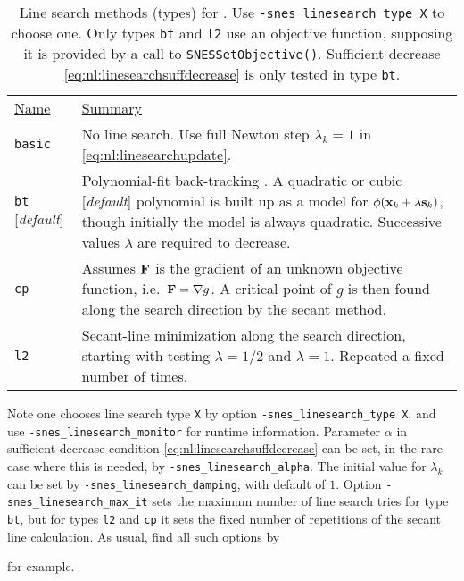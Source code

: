 \begin{table}
\begin{tabular}{ll}
\underline{Name} & \underline{Summary} \vspace{0.05in} \\ \vspace{0.1in}
\texttt{basic} & No line search.  Use full Newton step $\lambda_k=1$ in \eqref{eq:nl:linesearchupdate}. \\ \vspace{0.1in}
\texttt{bt} [\emph{default}] & \begin{minipage}[t]{0.8\textwidth}
Polynomial-fit back-tracking \citep[section 6.3.2]{DennisSchnabel1983}.  A quadratic or cubic [\emph{default}] polynomial is built up as a model for \mbox{$\phi(\mathbf{x}_k+\lambda \mathbf{s}_k)$}, though initially the model is always quadratic.  Successive values $\lambda$ are required to decrease.
\end{minipage} \\ \vspace{0.1in}
\texttt{cp} & \begin{minipage}[t]{0.83\textwidth}
Assumes $\mathbf{F}$ is the gradient of an unknown objective function, i.e.~\mbox{$\mathbf{F}=\nabla g$}.  A critical point of $g$ is then found along the search direction by the secant method.
\end{minipage} \\ \vspace{0.1in}
\texttt{l2} & \begin{minipage}[t]{0.83\textwidth}
Secant-line minimization along the search direction, starting with testing \mbox{$\lambda=1/2$} and \mbox{$\lambda=1$}. Repeated a fixed number of times.
\end{minipage}
\end{tabular}
\caption{Line search methods (types) for \pSNES.  Use \texttt{-snes\_linesearch\_type X} to choose one.  Only types \texttt{bt} and \texttt{l2} use an objective function, supposing it is provided by a call to \texttt{SNESSetObjective()}.  Sufficient decrease \eqref{eq:nl:linesearchsuffdecrease} is only tested in type \texttt{bt}.} \label{tab:nl:linesearchoptions}
\end{table}

Note one chooses line search type \texttt{X} by option \texttt{-snes\_linesearch\_type X}, and use \texttt{-snes\_linesearch\_monitor} for runtime information.  Parameter $\alpha$ in sufficient decrease condition \eqref{eq:nl:linesearchsuffdecrease} can be set, in the rare case where this is needed, by \texttt{-snes\_linesearch\_alpha}.  The initial value for $\lambda_k$ can be set by \texttt{-snes\_linesearch\_damping}, with default of $1$.  Option \texttt{-snes\_linesearch\_max\_it} sets the maximum number of line search tries for type \texttt{bt}, but for types \texttt{l2} and \texttt{cp} it sets the fixed number of repetitions of the secant line calculation.  As usual, find all such options by
for example.

